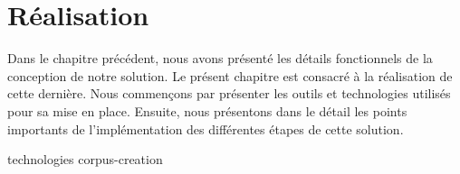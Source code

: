 \chapter{Réalisation}
\label{chap.realisation}

Dans le chapitre précédent, nous avons présenté les détails fonctionnels de la conception de notre solution.
Le présent chapitre est consacré à la réalisation de cette dernière.
Nous commençons par présenter les outils et technologies utilisés pour sa mise en place.
Ensuite, nous présentons dans le détail les points importants de l'implémentation des différentes étapes de cette solution.

{technologies}
{corpus-creation}